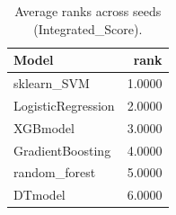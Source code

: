 \begin{table}[t]
\centering
\begin{tabular}{lr}
\toprule
Model & rank \\
\midrule
sklearn_SVM & 1.0000 \\
LogisticRegression & 2.0000 \\
XGBmodel & 3.0000 \\
GradientBoosting & 4.0000 \\
random_forest & 5.0000 \\
DTmodel & 6.0000 \\
\bottomrule
\end{tabular}
\caption{Average ranks across seeds (Integrated_Score).}
\label{tab:avg_rank_Integrated_Score}
\end{table}